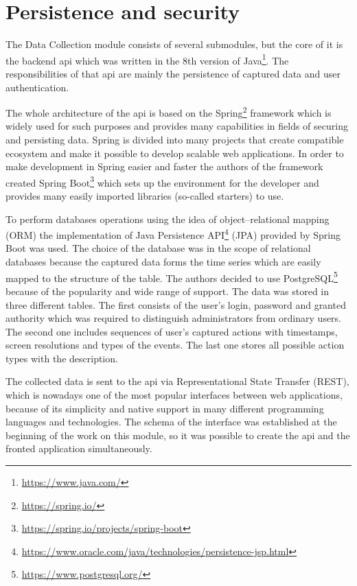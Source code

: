 \section{Persistence and security}\label{sec:persistence-and-security}
The Data Collection module consists of several submodules, but the core of it is the backend \gls{api} which was written in the 8th version of Java\footnote{\url{https://www.java.com/}}.
The responsibilities of that \gls{api} are mainly the persistence of captured data and user authentication.

The whole architecture of the \gls{api} is based on the Spring\footnote{\url{https://spring.io/}} framework which is widely used for such purposes and provides many capabilities in fields of securing and persisting data.
Spring is divided into many projects that create compatible ecosystem and make it possible to develop scalable web applications.
In order to make development in Spring easier and faster the authors of the framework created Spring Boot\footnote{\url{https://spring.io/projects/spring-boot}} which sets up the environment for the developer and provides many easily imported libraries (so-called starters) to use.

To perform databases operations using the idea of object–relational mapping (ORM) the implementation of Java Persistence API\footnote{\url{https://www.oracle.com/java/technologies/persistence-jsp.html}} (JPA) provided by Spring Boot was used.
The choice of the database was in the scope of relational databases because the captured data forms the time series which are easily mapped to the structure of the table.
The authors decided to use PostgreSQL\footnote{\url{https://www.postgresql.org/}} because of the popularity and wide range of support.
The data was stored in three different tables.
The first consists of the user's login, password and granted authority which was required to distinguish administrators from ordinary users.
The second one includes sequences of user's captured actions with timestamps, screen resolutions and types of the events.
The last one stores all possible action types with the description.

The collected data is sent to the \gls{api} via Representational State Transfer (REST), which is nowadays one of the most popular interfaces between web applications, because of its simplicity and native support in many different programming languages and technologies.
The schema of the interface was established at the beginning of the work on this module, so it was possible to create the \gls{api} and the fronted application simultaneously.

